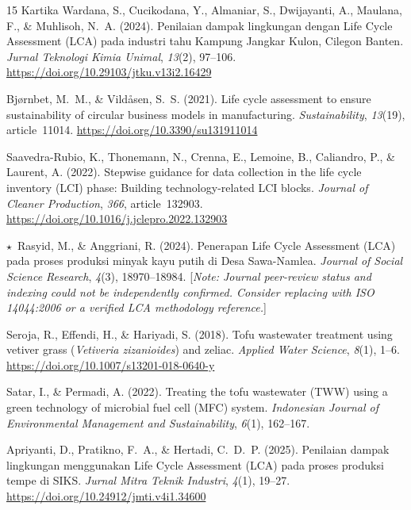 \documentclass[12pt,a4paper]{article}
\begin{document}
\begin{thebibliography}{15}
Kartika Wardana, S., Cucikodana, Y., Almaniar, S., Dwijayanti, A., Maulana, F., \&
Muhlisoh, N.~A. (2024).
Penilaian dampak lingkungan dengan Life Cycle Assessment (LCA) pada industri tahu Kampung Jangkar
Kulon, Cilegon Banten.
\textit{Jurnal Teknologi Kimia Unimal}, \textit{13}(2), 97--106.
\url{https://doi.org/10.29103/jtku.v13i2.16429}

Bj{\o}rnbet, M.~M., \& Vild{\aa}sen, S.~S. (2021).
Life cycle assessment to ensure sustainability of circular business models in manufacturing.
\textit{Sustainability}, \textit{13}(19), article~11014.
\url{https://doi.org/10.3390/su131911014}

Saavedra-Rubio, K., Thonemann, N., Crenna, E., Lemoine, B., Caliandro, P., \& Laurent, A. (2022).
Stepwise guidance for data collection in the life cycle inventory (LCI) phase: Building
technology-related LCI blocks.
\textit{Journal of Cleaner Production}, \textit{366}, article~132903.
\url{https://doi.org/10.1016/j.jclepro.2022.132903}

\textcolor{warnamber}{$\star$}~Rasyid, M., \& Anggriani, R. (2024).
Penerapan Life Cycle Assessment (LCA) pada proses produksi minyak kayu putih di Desa Sawa-Namlea.
\textit{Journal of Social Science Research}, \textit{4}(3), 18970--18984.
[\textit{Note: Journal peer-review status and indexing could not be independently confirmed. Consider
replacing with ISO 14044:2006 or a verified LCA methodology reference.}]

Seroja, R., Effendi, H., \& Hariyadi, S. (2018).
Tofu wastewater treatment using vetiver grass (\textit{Vetiveria zizanioides}) and zeliac.
\textit{Applied Water Science}, \textit{8}(1), 1--6.
\url{https://doi.org/10.1007/s13201-018-0640-y}

Satar, I., \& Permadi, A. (2022).
Treating the tofu wastewater (TWW) using a green technology of microbial fuel cell (MFC) system.
\textit{Indonesian Journal of Environmental Management and Sustainability}, \textit{6}(1), 162--167.

Apriyanti, D., Pratikno, F.~A., \& Hertadi, C.~D.~P. (2025).
Penilaian dampak lingkungan menggunakan Life Cycle Assessment (LCA) pada proses produksi tempe di SIKS.
\textit{Jurnal Mitra Teknik Industri}, \textit{4}(1), 19--27.
\url{https://doi.org/10.24912/jmti.v4i1.34600}

\end{thebibliography}
\end{document}
